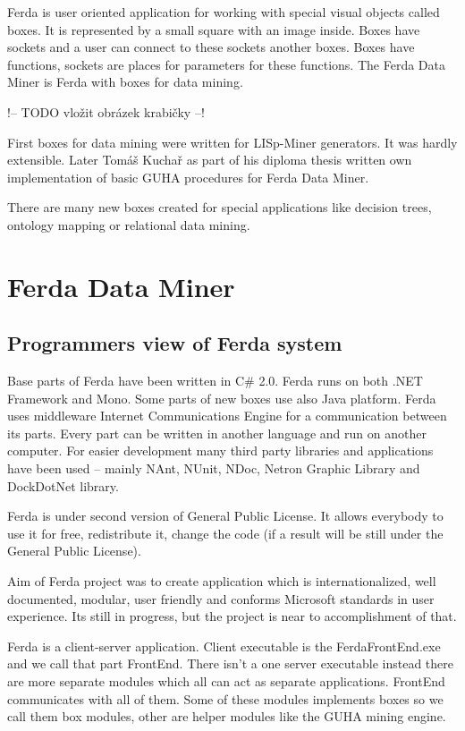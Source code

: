 \documentclass[a4paper,12pt]{book}
\begin{document}
Ferda is user oriented application for working with special visual objects called boxes. It is represented by a small square with an image inside. Boxes have sockets and a user can connect to these sockets another boxes. Boxes have functions, sockets are places for parameters for these functions. The Ferda Data Miner is Ferda with boxes for data mining.

!-- TODO vložit obrázek krabičky --!

First boxes for data mining were written for LISp-Miner generators. It was hardly extensible. Later Tomáš Kuchař as part of his diploma thesis \cite{thesisKuchar} written own implementation of basic GUHA procedures for Ferda Data Miner.

There are many new boxes created for special applications like decision trees, ontology mapping or relational data mining.

\section{Ferda Data Miner}
\subsection{Programmers view of Ferda system}

Base parts of Ferda have been written in C\# 2.0. Ferda runs on both .NET Framework and Mono. Some parts of new boxes use also Java platform. Ferda uses middleware Internet Communications Engine for a communication between its parts. Every part can be written in another language and run on another computer. For easier development many third party libraries and applications have been used -- mainly NAnt, NUnit, NDoc, Netron Graphic Library and DockDotNet library. 

Ferda is under second version of General Public License. It allows everybody to use it for free, redistribute it, change the code (if a result will be still under the General Public License).

Aim of Ferda project was to create application which is internationalized, well documented, modular, user friendly and conforms Microsoft standards in user experience. Its still in progress, but the project is near to accomplishment of that.

Ferda is a client-server application. Client executable is the FerdaFrontEnd.exe and we call that part FrontEnd. There isn't a one server executable instead there are more separate modules which all can act as separate applications. FrontEnd communicates with all of them. Some of these modules implements boxes so we call them box modules, other are helper modules like the GUHA mining engine.
\end{document}
